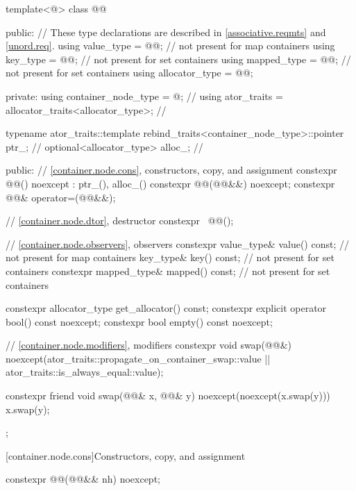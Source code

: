 \begin{codeblock}
template<@\unspecnc@>
class @@ {
public:
  // These type declarations are described in \ref{associative.reqmts} and \ref{unord.req}.
  using value_type     = @\seebelownc{}@;     // not present for map containers
  using key_type       = @\seebelownc{}@;     // not present for set containers
  using mapped_type    = @\seebelownc{}@;     // not present for set containers
  using allocator_type = @\seebelownc{}@;

private:
  using container_node_type = @\unspecnc@;                  // \expos
  using ator_traits = allocator_traits<allocator_type>;     // \expos

  typename ator_traits::template
    rebind_traits<container_node_type>::pointer ptr_;       // \expos
  optional<allocator_type> alloc_;                          // \expos

public:
  // \ref{container.node.cons}, constructors, copy, and assignment
  constexpr @@() noexcept : ptr_(), alloc_() {}
  constexpr @@(@@&&) noexcept;
  constexpr @@& operator=(@@&&);

  // \ref{container.node.dtor}, destructor
  constexpr ~@@();

  // \ref{container.node.observers}, observers
  constexpr value_type& value() const;          // not present for map containers
  key_type& key() const;                        // not present for set containers
  constexpr mapped_type& mapped() const;        // not present for set containers

  constexpr allocator_type get_allocator() const;
  constexpr explicit operator bool() const noexcept;
  constexpr bool empty() const noexcept;

  // \ref{container.node.modifiers}, modifiers
  constexpr void swap(@@&)
    noexcept(ator_traits::propagate_on_container_swap::value ||
             ator_traits::is_always_equal::value);

  constexpr friend void swap(@@& x, @@& y) noexcept(noexcept(x.swap(y))) {
    x.swap(y);
  }
};
\end{codeblock}

[container.node.cons]{Constructors, copy, and assignment}

\begin{itemdecl}
constexpr @@(@@&& nh) noexcept;
\end{itemdecl}

